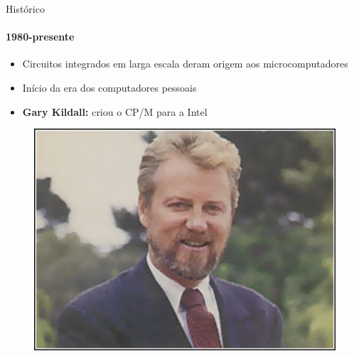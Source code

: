 \documentclass{beamer}
\begin{document}
\begin{frame}{Histórico}
	\framesubtitle{1980-presente}
	\begin{itemize}
		\item Circuitos integrados em larga escala deram origem aos \alert{microcomputadores}
		\item Início da era dos computadores pessoais
		\item \textbf{Gary Kildall:} criou o \alert{CP/M} para a Intel
	\end{itemize}
	\begin{figure}
		\includegraphics[width=0.4\paperwidth]{resources/gary}
	\end{figure}
\end{frame}
\end{document}
